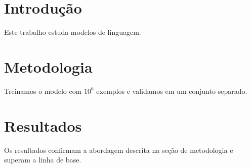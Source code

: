 \documentclass{article}
\begin{document}
\section{Introdução}\label{sec:intro}
Este trabalho estuda modelos de linguagem.

\section{Metodologia}
Treinamos o modelo com $10^6$ exemplos e validamos em um conjunto separado.

\section{Resultados}
Os resultados confirmam a abordagem descrita na seção de metodologia e superam a linha de base.
\end{document}

